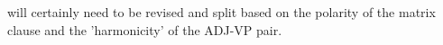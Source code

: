 \documentclass[10pt]{article}
\begin{document}
\vspace{-0.6em}
\vspace{-0.6em}
\noindent will certainly need to be revised and split based on the polarity of the matrix clause and the 'harmonicity' of the ADJ-VP pair. 

\end{document}

